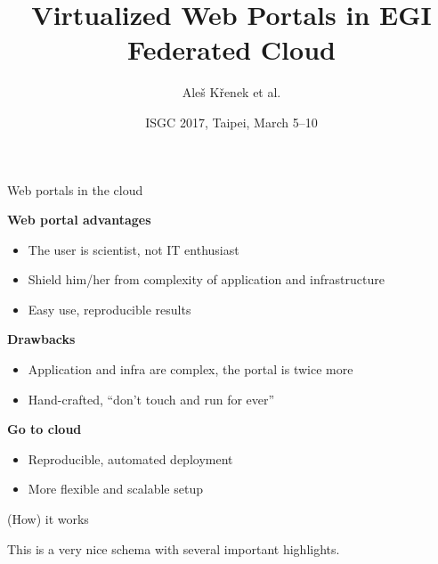 \documentclass[smaller,t]{beamer}
\begin{document}
\makeatletter

\title{Virtualized Web Portals in EGI \\[\smallskipamount] Federated Cloud}
\date{ISGC 2017, Taipei, March 5--10}
\author[A. Křenek et al.]{Aleš Křenek et al.}
\begin{frame}
\maketitle
\end{frame}

\begin{frame}{Web portals in the cloud}

\textbf{Web portal advantages}
\begin{itemize}
\item The user is scientist, not IT enthusiast
\item Shield him/her from complexity of application and infrastructure
\item Easy use, reproducible results
\end{itemize}

\pause
\textbf{Drawbacks}
\begin{itemize}
\item Application and infra are complex, the portal is twice more
\item Hand-crafted, ``don't touch and run for ever''
\end{itemize}

\pause
\textbf{Go to cloud}
\begin{itemize}
\item Reproducible, automated deployment
\item More flexible and scalable setup
\end{itemize}


\end{frame}

\begin{frame}{(How) it works}

\centering
This is a very nice schema with several \alert{important highlights.}



\end{frame}
\end{document}
